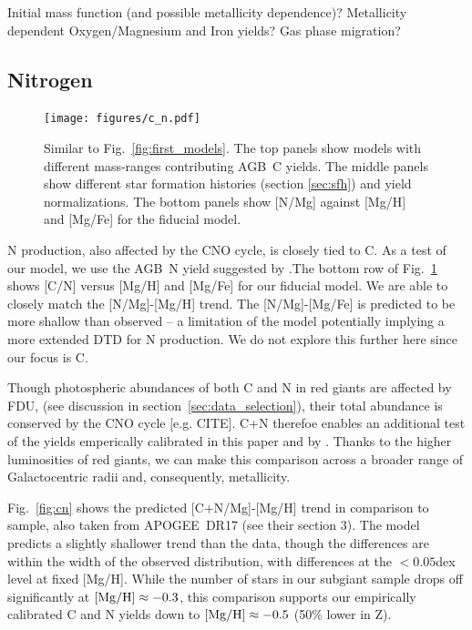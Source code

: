 \documentclass[fleqn,
usenatbib]{mnras}
\makeatletter
\newcommand{\agb}{AGB}
\newcommand{\apogee}{APOGEE}
\DeclareRobustCommand\citepos
  {\begingroup
   \let\NAT@nmfmt\NAT@posfmt%
   \NAT@swafalse\let\NAT@ctype\z@\NAT@partrue
   \@ifstar{\NAT@fulltrue\NAT@citetp}{\NAT@fullfalse\NAT@citetp}}
\let\NAT@orig@nmfmt\NAT@nmfmt
\def\NAT@posfmt#1{\NAT@orig@nmfmt{#1's}}
\makeatother
\begin{document}
Initial mass function (and possible metallicity dependence)? Metallicity dependent Oxygen/Magnesium and Iron yields? Gas phase migration?


\subsection{Nitrogen}


\begin{figure}
\centering
\texttt{[image: figures/c\_n.pdf]}

\caption[]{Similar to Fig.~\ref{fig:first_models}. The top panels show models with different mass-ranges contributing \agb\ C yields. The middle panels show different star formation histories (section \ref{sec:sfh}) and yield normalizations. The bottom panels show [N/Mg] against [Mg/H] and [Mg/Fe] for the fiducial model.
}
\label{fig:nitrogen}
\end{figure}

N production, also affected by the CNO cycle, is closely tied to C. As a test of our model, we use the \agb\ N yield suggested by \citet{james+23}.The bottom row of Fig.~\ref{fig:nitrogen} shows [C/N] versus [Mg/H] and [Mg/Fe] for our fiducial model. We are able to closely match the [N/Mg]-[Mg/H] trend. The [N/Mg]-[Mg/Fe] is predicted to be more shallow than observed -- a limitation of the model potentially implying a more extended DTD for N production. We do not explore this further here since our focus is C. 


Though photospheric abundances of both C and N in red giants are affected by FDU, (see discussion in section~\ref{sec:data_selection}), their total abundance is conserved by the CNO cycle [e.g. CITE]. C+N therefoe enables an additional test of the yields emperically calibrated in this paper and by \citet{james+23}. Thanks to the higher luminosities of red giants, we can make this comparison across a broader range of Galactocentric radii and, consequently, metallicity.

Fig.~\ref{fig:cn} shows the predicted [C+N/Mg]-[Mg/H] trend in comparison to \citepos{weinberg+22} sample, also taken from \apogee\ DR17 (see their section 3). The model predicts a slightly shallower trend than the data, though the differences are within the width of the observed distribution, with differences at the $<0.05$dex level at fixed [Mg/H]. 
While the number of stars in our subgiant sample drops off significantly at $\rm [Mg/H] \approx -0.3$, this comparison supports our empirically calibrated C and N yields down to $\rm [Mg/H] \approx-0.5$ (50\% lower in Z).
\end{document}
